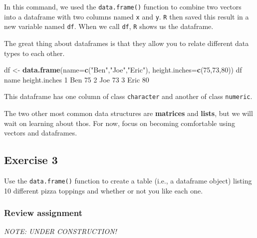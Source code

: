 \documentclass[
]{book}
\newenvironment{Shaded}{\begin{snugshade}}{\end{snugshade}}
\newcommand{\DataTypeTok}[1]{\textcolor[rgb]{0.13,0.29,0.53}{#1}}
\newcommand{\DecValTok}[1]{\textcolor[rgb]{0.00,0.00,0.81}{#1}}
\newcommand{\KeywordTok}[1]{\textcolor[rgb]{0.13,0.29,0.53}{\textbf{#1}}}
\newcommand{\NormalTok}[1]{#1}
\newcommand{\StringTok}[1]{\textcolor[rgb]{0.31,0.60,0.02}{#1}}
\begin{document}
In this command, we used the \texttt{data.frame()} function to combine two vectors into a dataframe with two columns named \texttt{x} and \texttt{y}. \texttt{R} then saved this result in a new variable named \texttt{df}. When we call \texttt{df}, \texttt{R} shows us the dataframe.

The great thing about dataframes is that they allow you to relate different data types to each other.

\begin{Shaded}
\begin{Highlighting}[]
\NormalTok{df <-}\StringTok{ }\KeywordTok{data.frame}\NormalTok{(}\DataTypeTok{name=}\KeywordTok{c}\NormalTok{(}\StringTok{"Ben"}\NormalTok{,}\StringTok{"Joe"}\NormalTok{,}\StringTok{"Eric"}\NormalTok{),}
                 \DataTypeTok{height.inches=}\KeywordTok{c}\NormalTok{(}\DecValTok{75}\NormalTok{,}\DecValTok{73}\NormalTok{,}\DecValTok{80}\NormalTok{))}
\NormalTok{df}
\NormalTok{  name height.inches}
\DecValTok{1}\NormalTok{  Ben            }\DecValTok{75}
\DecValTok{2}\NormalTok{  Joe            }\DecValTok{73}
\DecValTok{3}\NormalTok{ Eric            }\DecValTok{80}
\end{Highlighting}
\end{Shaded}

This dataframe has one column of class \texttt{character} and another of class \texttt{numeric}.

The two other most common data structures are \textbf{matrices} and \textbf{lists}, but we will wait on learning about thos. For now, focus on becoming comfortable using vectors and dataframes.

\hypertarget{exercise-3-1}{%
\subsection*{Exercise 3}\label{exercise-3-1}}

Use the \texttt{data.frame()} function to create a table (i.e., a dataframe object) listing 10 different pizza toppings and whether or not you like each one.

\hypertarget{review-assignment-3}{%
\subsubsection*{Review assignment}\label{review-assignment-3}}

\emph{NOTE: UNDER CONSTRUCTION!}
\end{document}

